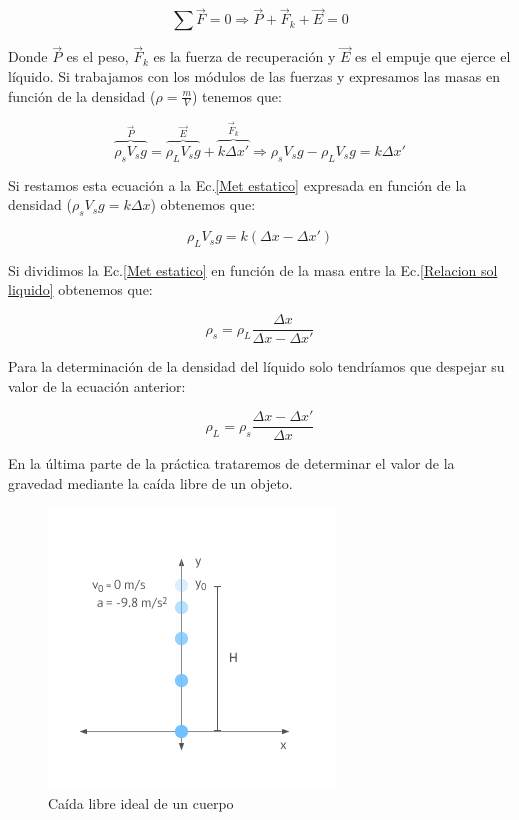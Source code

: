 \documentclass[a4paper,12pt,titlepage]{report}
\begin{document}
\begin{equation}
    \sum \vec{F} = 0 \Rightarrow \vec{P} + \vec{F}_k + \vec{E} = 0
\end{equation}

Donde $\vec{P}$ es el peso, $\vec{F}_k$ es la fuerza de recuperación y $\vec{E}$ es el empuje que ejerce el líquido. Si trabajamos con los módulos de las fuerzas y expresamos las masas en función de la densidad ($\rho = \frac{m}{V}$) tenemos que:

\begin{equation}
    \overbrace{\rho_s V_s g}^{\vec{P}} = \overbrace{\rho_L V_s g}^{\vec{E}} + \overbrace{k \Delta x'}^{\vec{F}_k} \Rightarrow \rho_s V_s g - \rho_L V_s g = k\Delta x'
\end{equation}

Si restamos esta ecuación a la Ec.\ref{Met estatico} expresada en función de la densidad ($\rho_s V_s g = k\Delta x$) obtenemos que:

\begin{equation}
    \rho_L V_s g = k (\Delta x -\Delta x')
    \label{Relacion sol liquido}
\end{equation}

Si dividimos la Ec.\ref{Met estatico} en función de la masa entre la Ec.\ref{Relacion sol liquido} obtenemos que:

\begin{equation}
    \rho_s = \rho_L \frac{\Delta x}{\Delta x - \Delta x'}
    \label{Densidad sol}
\end{equation}

Para la determinación de la densidad del líquido solo tendríamos que despejar su valor de la ecuación anterior:

\begin{equation}
    \rho_L = \rho_s \frac{\Delta x- \Delta x'}{\Delta x}
    \label{Densidad liq}
\end{equation}

En la última parte de la práctica trataremos de determinar el valor de la gravedad mediante la caída libre de un objeto.

\begin{figure}[h!]
    \centering
    \includegraphics[width=0.5\linewidth]{Images/caidalibre.png}
    \caption{Caída libre ideal de un cuerpo}
\end{figure}
\end{document}
